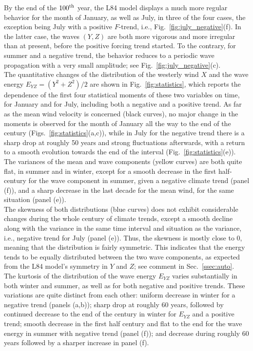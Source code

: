 \documentclass[%
 aip, cha,
 amsmath,amssymb,
 reprint,%
author-year,%
]{revtex4-1}
\newcommand{\0}{\mathbf 0}
\begin{document}
By the end of the $100^{\rm{th}}$ year, the L84 model displays a much more regular behavior for the month of January, as well as July, in three of the four cases, the exception being July with a positive $F$-trend, i.e., Fig.~\ref{fig:july_negative}(f). In the latter case, the waves $(Y,Z)$ are both more vigorous and more irregular than at present, before the positive forcing trend started. To the contrary, for summer and a negative trend, the behavior reduces to a periodic wave propagation with a very small amplitude; see Fig.~\ref{fig:july_negative}(c). \\   
The quantitative changes of the distribution of the westerly wind $X$ and the wave energy $E_{YZ}  = (Y^2+Z^2)/2$ are shown in Fig.~\ref{fig:statistics}, which reports the dependence of the first four statistical moments of these two variables on time, for January and for July, including both a negative and a positive trend.
As far as the mean wind velocity is concerned (black curves), no major change in the moments is observed for the month of January all the way to the end of the century (Figs.~\ref{fig:statistics}(a,c)), while in July for the negative trend there is a sharp drop at roughly 50 years and strong fluctuations afterwards, with a return to a smooth evolution towards the end of the interval (Fig.~\ref{fig:statistics}(e)). \\ 
The variances of the mean and wave components (yellow curves) are both quite flat, in summer and in winter, except for a smooth decrease in the first half-century for the wave component in summer, given a negative climate trend (panel (f)), and a sharp decrease in the last decade for the mean wind, for the same situation (panel (e)). \\ 
The skewness of both distributions (blue curves) does not exhibit considerable changes during the whole century of climate trends, except a smooth decline along with the variance in the same time interval and situation as the variance, i.e., negative trend for July (panel (e)). Thus, the skewness is mostly close to 0, meaning that the distribution is fairly symmetric. This indicates that the energy tends to be equally distributed between the two wave components, as expected from the L84 model's symmetry in $Y$ and $Z$; see comment in Sec.~\ref{ssec:auto}. \\
The kurtosis of the distribution of the wave energy $E_{YZ}$ varies substantially in both winter and summer, as well as for both negative and positive trends. These variations are quite distinct from each other: uniform decrease in winter for a negative trend (panels (a,b)); sharp drop at roughly 60 years, followed by continued decrease to the end of the century in winter for $E_{YZ}$ and a  positive trend; smooth decrease in the first half century and flat to the end for the wave energy in summer with negative trend (panel (f)); and decrease during roughly 60 years followed by a sharper increase in panel (f). \\
\end{document}
